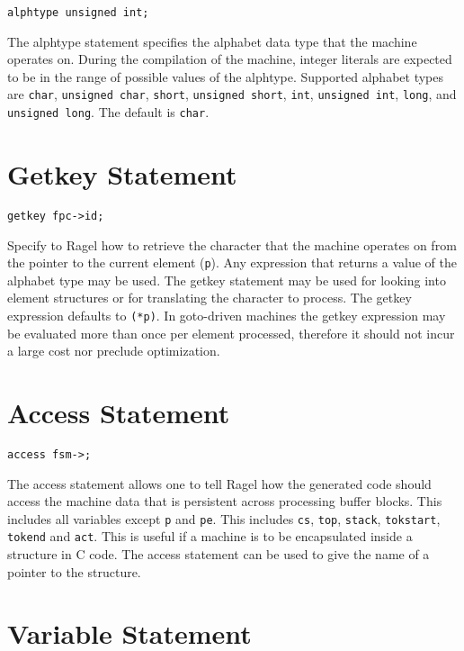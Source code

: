 \documentclass[letterpaper,11pt,oneside]{book}
\newcommand{\verbspace}{\vspace{10pt}}
\begin{document}
\begin{verbatim}
alphtype unsigned int;
\end{verbatim}
\verbspace

The alphtype statement specifies the alphabet data type that the machine
operates on. During the compilation of the machine, integer literals are expected to
be in the range of possible values of the alphtype.  Supported alphabet types
are \verb|char|, \verb|unsigned char|, \verb|short|, \verb|unsigned short|,
\verb|int|, \verb|unsigned int|, \verb|long|, and \verb|unsigned long|. 
The default is \verb|char|.

\section{Getkey Statement}

\begin{verbatim}
getkey fpc->id;
\end{verbatim}
\verbspace

Specify to Ragel how to retrieve the character that the machine operates on
from the pointer to the current element (\verb|p|). Any expression that returns
a value of the alphabet type
may be used. The getkey statement may be used for looking into element
structures or for translating the character to process. The getkey expression
defaults to \verb|(*p)|. In goto-driven machines the getkey expression may be
evaluated more than once per element processed, therefore it should not incur a
large cost nor preclude optimization.

\section{Access Statement}

\begin{verbatim}
access fsm->;
\end{verbatim}
\verbspace

The access statement allows one to tell Ragel how the generated code should
access the machine data that is persistent across processing buffer blocks.
This includes all variables except \verb|p| and \verb|pe|. This includes
\verb|cs|, \verb|top|, \verb|stack|, \verb|tokstart|, \verb|tokend| and \verb|act|.
This is useful if a machine is to be encapsulated inside a
structure in C code. The access statement can be used to give the name of
a pointer to the structure.

\section{Variable Statement}
\end{document}
